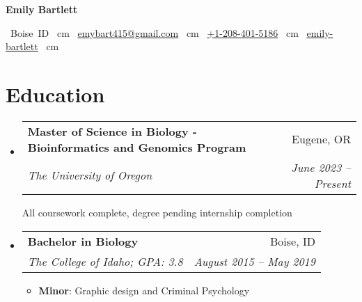 \documentclass[letterpaper,11pt]{article}
\makeatletter
\newcommand{\resumeItemColon}[2]{
  \item\small{
    \textbf{#1}{: #2 \vspace{-2pt}}
  }
}
\newcommand{\resumeSubheading}[4]{
  \vspace{-1pt}\item
    \begin{tabular*}{0.97\textwidth}[t]{l@{\extracolsep{\fill}}r}
      \textbf{#1} & #2 \\
      \textit{\small#3} & \textit{\small #4} \\
    \end{tabular*}\vspace{-5pt}
}
\newcommand{\resumeSubHeadingListStart}{\begin{itemize}[leftmargin=*]}
\newcommand{\resumeSubHeadingListEnd}{\end{itemize}}
\newcommand{\resumeItemListStart}{\begin{itemize}}
\newcommand{\resumeItemListEnd}{\end{itemize}\vspace{-5pt}}
\newenvironment{header}{
    \setlength{\topsep}{0pt}\par\kern\topsep\centering\linespread{1.5}
}{
    \par\kern\topsep
} %
\let\hrefWithoutArrow\href
\renewcommand{\href}[2]{\hrefWithoutArrow{#1}{\mbox{\ifthenelse{\equal{#2}{}}{ }{#2 }\raisebox{.15ex}{\footnotesize \faExternalLink*}}}}
\makeatother
\begin{document}

\begin{header}
  \textbf{\fontsize{30 pt}{30 pt}\selectfont Emily Bartlett}

  \vspace{0.3 cm}

  \normalsize
  \mbox{
      {\color{black}{\footnotesize\faMapMarker*}\hspace*{0.13cm}Boise ID}
  }
   cm
  \mbox{
      \hrefWithoutArrow{mailto:ebart415@gmail.com}{\color{black}{\footnotesize\faEnvelope[regular]}\hspace*{0.13cm}emybart415@gmail.com}
  }
   cm
  \mbox{
      \hrefWithoutArrow{tel:+12084015186}{\color{black}{\footnotesize\faPhone*}\hspace*{0.13cm}+1-208-401-5186}
  }
   cm
  \mbox{
      \hrefWithoutArrow{https://github.com/emybart415}{\color{black}{\footnotesize\faGithub}\hspace*{0.13cm}emily-bartlett}
  }
   cm
\end{header}


\section{Education}
  \resumeSubHeadingListStart
    \resumeSubheading
      {Master of Science in Biology - Bioinformatics and Genomics Program}{Eugene, OR}
      {The University of Oregon}{June 2023 -- Present}
    
\smallskip
      {All coursework complete, degree pending internship completion}
    \resumeSubheading
      {Bachelor in Biology}{Boise, ID}
      {The College of Idaho; GPA: 3.8}{August 2015 -- May 2019}
      \resumeItemListStart
        \resumeItemColon{Minor}
          {Graphic design and Criminal Psychology}
      \resumeItemListEnd
  \resumeSubHeadingListEnd
\end{document}
